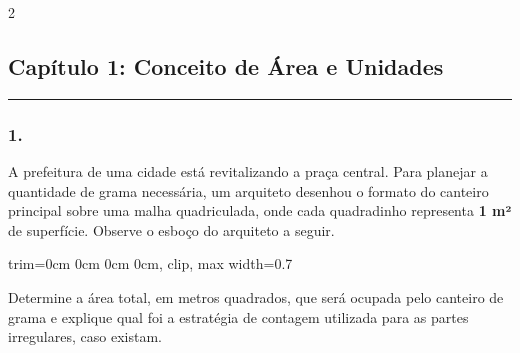 \documentclass[twoside, 10pt, a4paper]{article}
\newlength{\espacoPosTitulo}\setlength{\espacoPosTitulo}{0.3cm}
\newlength{\espacoQuestao}\setlength{\espacoQuestao}{0.2cm}
\newcommand{\larguraTikz}{0.85\linewidth}
\begin{document}
\par\vspace{0.3cm} 
\raggedcolumns
\begin{multicols*}{2}
\vspace{0.1cm}

\subsection*{Capítulo 1: Conceito de Área e Unidades}
\vspace{-0.2cm}\noindent\rule{\linewidth}{1.5pt} 
\par\vspace{\espacoPosTitulo}

\subsubsection*{1.} A prefeitura de uma cidade está revitalizando a praça central. Para planejar a quantidade de grama necessária, um arquiteto desenhou o formato do canteiro principal sobre uma malha quadriculada, onde cada quadradinho representa \textbf{1 m²} de superfície. Observe o esboço do arquiteto a seguir.

\begin{center}
\begin{adjustbox}{trim=0cm 0cm 0cm 0cm, clip, max width=0.7\linewidth}
\end{adjustbox}
\end{center}

Determine a área total, em metros quadrados, que será ocupada pelo canteiro de grama e explique qual foi a estratégia de contagem utilizada para as partes irregulares, caso existam.
\par\vspace{\espacoQuestao}


\end{multicols*}
\end{document}
